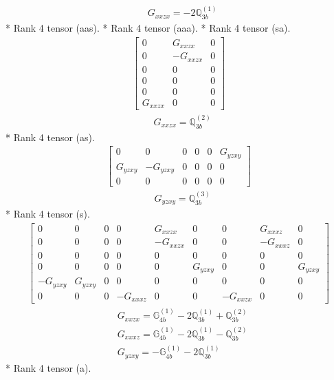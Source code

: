 \documentclass[fleqn,8pt,landscape]{jsarticle}
\begin{document}
\begin{align*}
& G_{xxzx} = - 2 \mathbb{Q}_{3b}^{(1)}
\end{align*}
* Rank 4 tensor (aas).
* Rank 4 tensor (aaa).
* Rank 4 tensor (sa).
\begin{align*}
\begin{bmatrix} 0 & G_{xxzx} & 0 \\ 0 & - G_{xxzx} & 0 \\ 0 & 0 & 0 \\ 0 & 0 & 0 \\ 0 & 0 & 0 \\ G_{xxzx} & 0 & 0 \end{bmatrix}
\end{align*}
\begin{align*}
& G_{xxzx} = \mathbb{Q}_{3b}^{(2)}
\end{align*}
* Rank 4 tensor (as).
\begin{align*}
\begin{bmatrix} 0 & 0 & 0 & 0 & 0 & G_{yzxy} \\ G_{yzxy} & - G_{yzxy} & 0 & 0 & 0 & 0 \\ 0 & 0 & 0 & 0 & 0 & 0 \end{bmatrix}
\end{align*}
\begin{align*}
& G_{yzxy} = \mathbb{Q}_{3b}^{(3)}
\end{align*}
* Rank 4 tensor (s).
\begin{align*}
\begin{bmatrix} 0 & 0 & 0 & 0 & G_{xxzx} & 0 & 0 & G_{xxxz} & 0 \\ 0 & 0 & 0 & 0 & - G_{xxzx} & 0 & 0 & - G_{xxxz} & 0 \\ 0 & 0 & 0 & 0 & 0 & 0 & 0 & 0 & 0 \\ 0 & 0 & 0 & 0 & 0 & G_{yzxy} & 0 & 0 & G_{yzxy} \\ - G_{yzxy} & G_{yzxy} & 0 & 0 & 0 & 0 & 0 & 0 & 0 \\ 0 & 0 & 0 & - G_{xxxz} & 0 & 0 & - G_{xxzx} & 0 & 0 \end{bmatrix}
\end{align*}
\begin{align*}
& G_{xxzx} = \mathbb{G}_{4b}^{(1)} - 2 \mathbb{Q}_{3b}^{(1)} + \mathbb{Q}_{3b}^{(2)} \\
& G_{xxxz} = \mathbb{G}_{4b}^{(1)} - 2 \mathbb{Q}_{3b}^{(1)} - \mathbb{Q}_{3b}^{(2)} \\
& G_{yzxy} = - \mathbb{G}_{4b}^{(1)} - 2 \mathbb{Q}_{3b}^{(1)}
\end{align*}
* Rank 4 tensor (a).
\end{document}
